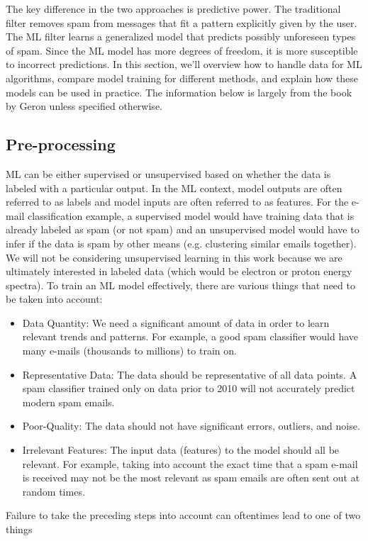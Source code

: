 The key difference in the two approaches is predictive power. The traditional filter removes spam from messages that fit a pattern explicitly given by the user. The \gls{ML} filter learns a generalized model that predicts possibly unforeseen types of spam. Since the \gls{ML} model has more degrees of freedom, it is more susceptible to incorrect predictions. In this section, we'll overview how to handle data for \gls{ML} algorithms, compare model training for different methods, and explain how these models can be used in practice. The information below is largely from the book by Geron \cite{Geron_2023_ML} unless specified otherwise.

\subsection{Pre-processing}
\gls{ML} can be either supervised or unsupervised based on whether the data is labeled with a particular output. In the \gls{ML} context, model outputs are often referred to as labels and model inputs are often referred to as features. For the e-mail classification example, a supervised model would have training data that is already labeled as spam (or not spam) and an unsupervised model would have to infer if the data is spam by other means (e.g. clustering similar emails together). We will not be considering unsupervised learning in this work because we are ultimately interested in labeled data (which would be electron or proton energy spectra). To train an \gls{ML} model effectively, there are various things that need to be taken into account: 

\begin{itemize}
	\item Data Quantity: We need a significant amount of data in order to learn relevant trends and patterns. For example, a good spam classifier would have many e-mails (thousands to millions) to train on.
	\item Representative Data: The data should be representative of all data points. A spam classifier trained only on data prior to 2010 will not accurately predict modern spam emails.
	\item Poor-Quality: The data should not have significant errors, outliers, and noise. 
	\item Irrelevant Features: The input data (features) to the model should all be relevant. For example, taking into account the exact time that a spam e-mail is received may not be the most relevant as spam emails are often sent out at random times. 
\end{itemize}
Failure to take the preceding steps into account can oftentimes lead to one of two things

